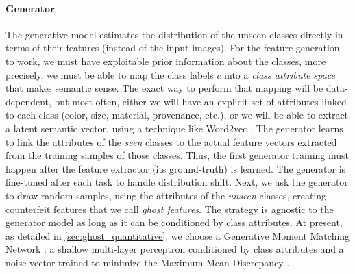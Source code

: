 \paragraph{Generator} The generative model estimates the distribution of the unseen classes directly
in terms of their features (instead of the input images). For the feature generation to work, we
must have exploitable prior information about the classes, more precisely, we must be able to map
the class labels $c$ into a \textit{class attribute space} that makes semantic sense. The exact way
to perform that mapping will be data-dependent, but most often, either we will have an explicit set
of attributes linked to each class (color, size, material, provenance, etc.), or we will be able to
extract a latent semantic vector, using a technique like Word2vec
\citep{mikolov2013word2vec,pennington2014glove}. The generator learns to link the attributes of the
\textit{seen} classes to the actual feature vectors extracted from the training samples of those
classes. Thus, the first generator training must happen after the feature extractor (its
ground-truth) is learned. The generator is fine-tuned after each task to handle distribution shift.
Next, we ask the generator to draw random samples, using the attributes of the \textit{unseen}
classes, creating counterfeit features that we call \textit{ghost features}. The strategy is
agnostic to the generator model as long as it can be conditioned by class attributes.  At present,
as detailed in \autoref{sec:ghost_quantitative}, we choose a Generative Moment Matching Network
\citep{li2015gmmn}: a shallow multi-layer perceptron conditioned by class attributes and a noise
vector trained to minimize the Maximum Mean Discrepancy
\citep{gretton2007twosampleMMD,gretton2012twosampletestMMD}.



\label{sec:ghost_generator}

